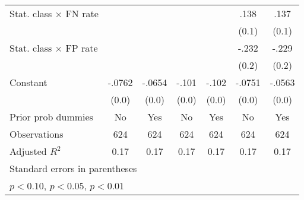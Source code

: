 \begin{table}[htbp]
\begin{tabular}{l*{6}{c}}
Stat. class $\times$ FN rate&                  &                  &                  &                  &     .138         &     .137         \\
                &                  &                  &                  &                  &    (0.1)         &    (0.1)         \\
Stat. class $\times$ FP rate&                  &                  &                  &                  &    -.232         &    -.229         \\
                &                  &                  &                  &                  &    (0.2)         &    (0.2)         \\
Constant        &   -.0762\sym{***}&   -.0654\sym{***}&    -.101\sym{***}&    -.102\sym{***}&   -.0751\sym{***}&   -.0563         \\
                &    (0.0)         &    (0.0)         &    (0.0)         &    (0.0)         &    (0.0)         &    (0.0)         \\
Prior prob dummies &       No         &      Yes         &       No         &      Yes         &       No         &      Yes         \\
\hline
Observations    &      624         &      624         &      624         &      624         &      624         &      624         \\
Adjusted \(R^{2}\)&     0.17         &     0.17         &     0.17         &     0.17         &     0.17         &     0.17         \\
\hline\hline
\multicolumn{7}{l}{\footnotesize Standard errors in parentheses}\\
\multicolumn{7}{l}{\footnotesize \sym{*} \(p<0.10\), \sym{**} \(p<0.05\), \sym{***} \(p<0.01\)}\\
\end{tabular}
\end{table}
